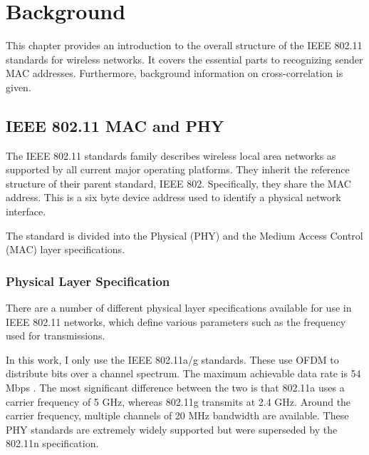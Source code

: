 
\chapter{Background}\label{ch:relatedwork}
\glsresetall %
 

This chapter provides an introduction to the overall structure of the \gls{IEEE} 802.11 standards for wireless networks. It covers the essential parts to recognizing sender \gls{MAC} addresses. Furthermore, background information on cross-correlation is given.



\section{IEEE 802.11 MAC and PHY} \label{sec:mac-and-phy}

The \gls{IEEE} 802.11 standards family describes wireless local area networks as supported by all current major operating platforms. They inherit the reference structure of their parent standard, \gls{IEEE} 802. Specifically, they share the \gls{MAC} address. This is a six byte device address used to identify a physical network interface.

The standard is divided into the Physical (PHY) and the Medium Access Control (MAC) layer specifications.


\subsection{Physical Layer Specification}

There are a number of different physical layer specifications available for use in \gls{IEEE} 802.11 networks, which define various parameters such as the frequency used for transmissions.

In this work, I only use the \gls{IEEE} 802.11a/g standards. These use \gls{OFDM} to distribute bits over a channel spectrum. The maximum achievable data rate is 54 \gls{Mbps} \cite{ieee2012}. The most significant difference between the two is that 802.11a uses a carrier frequency of 5 GHz, whereas 802.11g transmits at 2.4 GHz. Around the carrier frequency, multiple channels of 20 MHz bandwidth are available. These \gls{PHY} standards are extremely widely supported but were superseded by the 802.11n specification.

